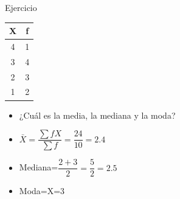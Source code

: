 \documentclass[xcolor=dvipsnames]{beamer}
\begin{document}
	\begin{frame}{Ejercicio}
\begin{center}
\begin{table}[H]
\begin{tabular}{cc} \hline
X & f \\ \hline
4&1 \\
3&4 \\
2&3 \\
1&2 \\ \hline
\end{tabular}
\end{table}
\end{center}
\begin{itemize}
\item ¿Cuál es la media, la mediana y la moda?
\pause \item 	$\bar{X}=\dfrac{\sum{fX}}{\sum{f}}=\dfrac{24}{10}=2.4$
\pause \item Mediana=$\dfrac{2+3}{2}=\dfrac{5}{2}=2.5$
\pause \item Moda=X=3
\end{itemize}
	\end{frame}
\end{document}
